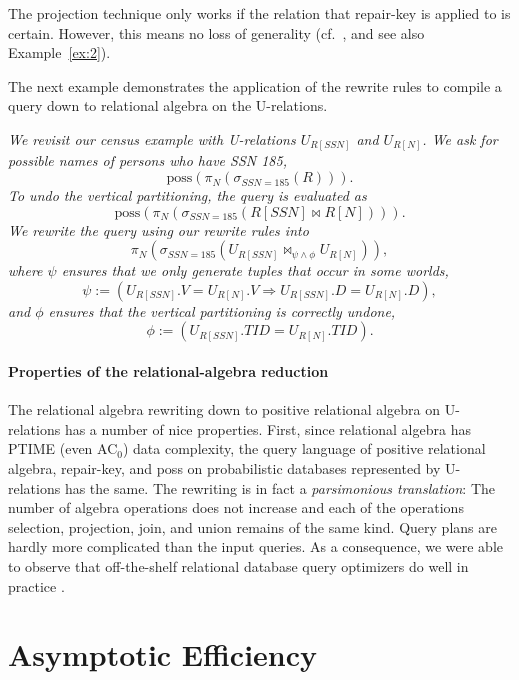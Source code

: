 The projection technique only works if the relation that repair-key is applied to is certain.
However, this means no loss of generality (cf.\ \cite{Koch2008-SO}, and see also Example~\ref{ex:2}).

The next example demonstrates the application of the rewrite rules to compile a query down to relational algebra on the U-relations.


\begin{example}\em
\label{ex:proc_urel}
We revisit our census example with U-relations $U_{R[SSN]}$ and $U_{R[N]}$.
We ask for possible names of persons who have SSN 185,
\[
\mbox{poss}(\pi_N(\sigma_{SSN=185}(R))).
\]
To undo the vertical partitioning, the query
is evaluated as
\[
\mbox{poss}(\pi_N(\sigma_{SSN=185}(R[SSN] \bowtie R[N]))).
\]
We rewrite the query using our rewrite rules into 
\[
\pi_N(\sigma_{SSN=185}(U_{R[SSN]}
   \bowtie_{\psi\wedge\phi} U_{R[N]})),
\]
where
$\psi$ ensures that we only generate tuples that occur in some worlds,
\[
\psi := (U_{R[SSN]}.V = U_{R[N]}.V \Rightarrow
    U_{R[SSN]}.D=U_{R[N]}.D),
\]
and $\phi$ ensures that the vertical partitioning is correctly undone,
\[
\phi := (U_{R[SSN]}.TID = U_{R[N]}.TID).
\]

\vspace{-5mm}

\punto
\end{example}



\paragraph{Properties of the relational-algebra reduction}
The relational algebra rewriting down to positive relational algebra on U-relations has
a number of nice properties. First, since relational algebra has PTIME (even AC$_0$) data complexity, the query language of positive relational algebra, repair-key, and poss on probabilistic databases represented by U-relations has the same.
The rewriting is in fact a {\em parsimonious translation}\/: The number of algebra operations does not increase and each of the operations selection, projection, join, and union remains of the same kind. Query plans are hardly more complicated than
the input queries. As a consequence, we were able to observe that off-the-shelf relational database query optimizers
do well in practice \cite{AJKO2008}.



\section{Asymptotic Efficiency}


